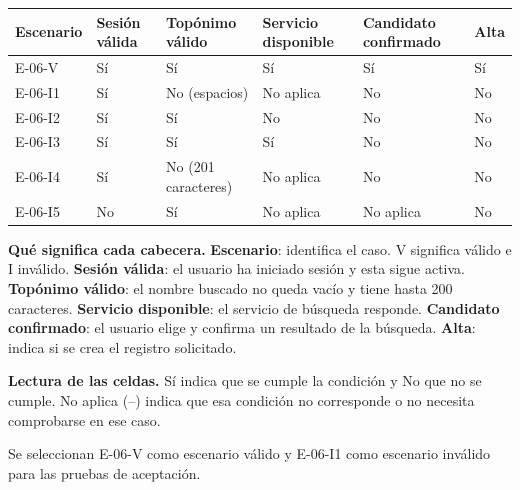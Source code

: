 \begingroup\fontsize{7.8}{11}\selectfont\setlength{\tabcolsep}{3pt}
\begin{tabularx}{\linewidth}{@{}*{6}{Y}@{}}\toprule
\textbf{Escenario} & \textbf{Sesión válida} & \textbf{Topónimo válido} & \textbf{Servicio disponible} & \textbf{Candidato confirmado} & \textbf{Alta}\\\midrule
E-06-V & Sí & Sí & Sí & Sí & Sí\\[3pt]
E-06-I1 & Sí & No (espacios) & No aplica & No & No\\[3pt]
E-06-I2 & Sí & Sí & No & No & No\\[3pt]
E-06-I3 & Sí & Sí & Sí & No & No\\[3pt]
E-06-I4 & Sí & No (201 caracteres) & No aplica & No & No\\[3pt]
E-06-I5 & No & Sí & No aplica & No aplica & No\\[3pt]
\bottomrule\end{tabularx}\endgroup\par
{\fontsize{9}{11}\selectfont\textbf{Qué significa cada cabecera.} \textbf{Escenario}: identifica el caso. V significa válido e I inválido. \textbf{Sesión válida}: el usuario ha iniciado sesión y esta sigue activa. \textbf{Topónimo válido}: el nombre buscado no queda vacío y tiene hasta 200 caracteres. \textbf{Servicio disponible}: el servicio de búsqueda responde. \textbf{Candidato confirmado}: el usuario elige y confirma un resultado de la búsqueda. \textbf{Alta}: indica si se crea el registro solicitado.\par\textbf{Lectura de las celdas.} Sí indica que se cumple la condición y No que no se cumple. No aplica (--) indica que esa condición no corresponde o no necesita comprobarse en ese caso.\par}


Se seleccionan E-06-V como escenario válido y E-06-I1 como escenario inválido para las pruebas de aceptación.\par


